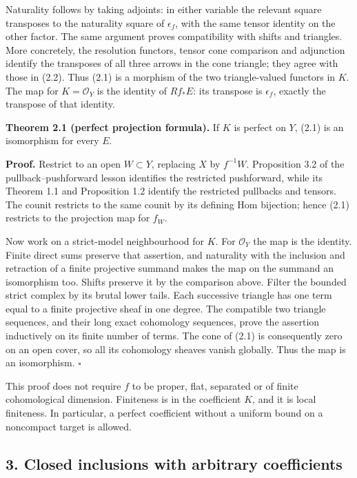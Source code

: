 \documentclass[
  english,
  11pt,
  a4paper,
]{article}
\begin{document}
Naturality follows by taking adjoints: in either variable the relevant
square transposes to the naturality square of \(\epsilon_f\), with the
same tensor identity on the other factor. The same argument proves
compatibility with shifts and triangles. More concretely, the resolution
functors, tensor cone comparison and adjunction identify the transposes
of all three arrows in the cone triangle; they agree with those in
(2.2). Thus (2.1) is a morphism of the two triangle-valued functors in
\(K\). The map for \(K=\mathcal O_Y\) is the identity of \(Rf_*E\): its
transpose is \(\epsilon_f\), exactly the transpose of that identity.

\textbf{Theorem 2.1 (perfect projection formula).} If \(K\) is perfect
on \(Y\), (2.1) is an isomorphism for every \(E\).

\textbf{Proof.} Restrict to an open \(W\subset Y\), replacing \(X\) by
\(f^{-1}W\). Proposition 3.2 of the pullback--pushforward lesson
identifies the restricted pushforward, while its Theorem 1.1 and
Proposition 1.2 identify the restricted pullbacks and tensors. The
counit restricts to the same counit by its defining Hom bijection; hence
(2.1) restricts to the projection map for \(f_W\).

Now work on a strict-model neighbourhood for \(K\). For \(\mathcal O_Y\)
the map is the identity. Finite direct sums preserve that assertion, and
naturality with the inclusion and retraction of a finite projective
summand makes the map on the summand an isomorphism too. Shifts preserve
it by the comparison above. Filter the bounded strict complex by its
brutal lower tails. Each successive triangle has one term equal to a
finite projective sheaf in one degree. The compatible two triangle
sequences, and their long exact cohomology sequences, prove the
assertion inductively on its finite number of terms. The cone of (2.1)
is consequently zero on an open cover, so all its cohomology sheaves
vanish globally. Thus the map is an isomorphism. \(\square\)

This proof does not require \(f\) to be proper, flat, separated or of
finite cohomological dimension. Finiteness is in the coefficient \(K\),
and it is local finiteness. In particular, a perfect coefficient without
a uniform bound on a noncompact target is allowed.

\subsection{3. Closed inclusions with arbitrary
coefficients}\label{projection-formula-and-base-change--3-closed-inclusions-with-arbitrary-coefficients}
\end{document}
